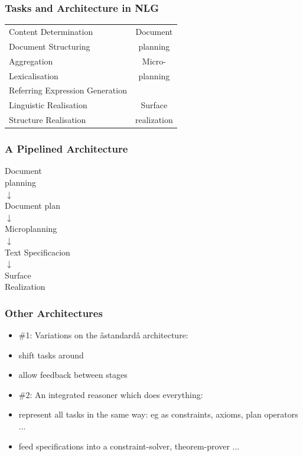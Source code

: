 \documentclass[compress,color=usenames]{beamer}
\begin{document}
\begin{frame}
\frametitle{Tasks and Architecture in NLG}

\begin{center}
\begin{tabular}{|l|c|}  \hline
Content Determination & Document \\
Document Structuring &  planning\\ \hline
Aggregation &  Micro-\\
Lexicalisation & planning\\
Referring Expression Generation & \\ \hline
Linguistic Realisation & Surface\\
Structure Realisation & realization\\ \hline
\end{tabular}
\end{center}

\end{frame}

\begin{frame}
\frametitle{A Pipelined Architecture}

\begin{center}
Document\\
planning\\
$\downarrow$\\
Document plan\\
$\downarrow$\\
Microplanning\\
$\downarrow$\\
Text Specificacion\\
$\downarrow$\\
Surface\\
Realization
\end{center}

\end{frame}

\begin{frame}
\frametitle{Other Architectures}

\label{f60}
\begin{itemize}
\item { {\#1: Variations on the \^astandard\^a architecture:}}
\item { {shift tasks around}}
\item { {allow feedback between stages}}
\item { {\#2: An integrated reasoner which does everything:}}
\item { {represent all tasks in the same way: eg as constraints, axioms, plan operators ...}}
\item { {feed specifications into a constraint-solver, theorem-prover ...}}
\end{itemize}

\end{frame}
\end{document}
